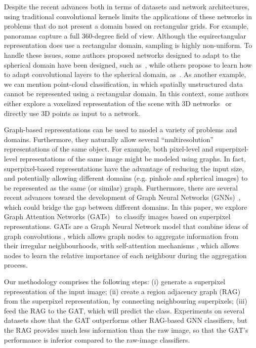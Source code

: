 \documentclass[twocolumn]{article}
\begin{document}
Despite the recent advances both in terms of datasets and network architectures, using traditional convolutional kernels limits the applications of these networks in problems that do not present a domain based on rectangular grids. For example, panoramas capture a full 360-degree field of view. Although the equirectangular representation does use a rectangular domain, sampling is highly non-uniform. To handle these issues, some authors proposed networks designed to adapt to the spherical domain have been designed, such as~\cite{cohen2018spherical}, while others propose to learn how to adapt convolutional layers to the spherical domain, as~\cite{su2019kernel}. As another example, we can mention point-cloud classification, in which spatially unstructured data cannot be represented using a rectangular domain. In this context, some authors either explore a voxelized representation of the scene with 3D networks~\cite{wu20153d} or directly use 3D points as input to a network. 

Graph-based representations can be used to model a variety of problems and domains. Furthermore, they naturally allow several ``multiresolution'' representations of the same object. For example, both pixel-level and superpixel-level representations of the same image might be modeled using graphs. 
In fact, superpixel-based representations have the advantage of reducing the input size, and potentially allowing different domains (e.g. pinhole and spherical images) to be represented as the same (or similar) graph. 
Furthermore, there 
are
several recent advances toward the development of Graph Neural Networks (GNNs)~\cite{wu2020comprehensive}, which could bridge the gap between different domains.
In this paper, we explore Graph Attention Networks (GATs)~\cite{velickovic2018gat} to classify images based on superpixel representations.
GATs are a Graph Neural Network model that combine ideas of graph convolutions \cite{kipf2016semi}, which allows graph nodes to aggregate information from their irregular neighbourhoods, with self-attention mechanisms \cite{Vaswani2017attention}, which allows nodes to learn the relative importance of each neighbour during the aggregation process.





Our methodology comprises the following steps: (i) generate a superpixel representation of the input image; (ii) create a region adjacency graph (RAG) from the superpixel representation, by connecting neighbouring superpixels; (iii) feed the RAG to the GAT, which will predict the class. 
Experiments on several datasets show that the GAT outperforms other RAG-based GNN classifiers, but the RAG provides much less information than the raw image, so that the GAT's performance is inferior compared to the raw-image classifiers.
\end{document}
